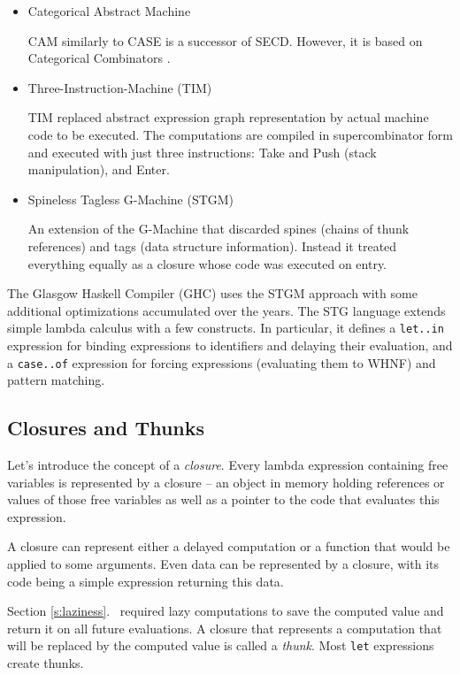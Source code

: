 \documentclass[en]{pracamgr}
\newcommand{\myref}[1]{\ref{#1}.~\textit{\nameref{#1}}}
\begin{document}
\begin{itemize}
    \item Categorical Abstract Machine \cite{CAM0,CAM}
    
        CAM similarly to CASE is a successor of SECD.
        However, it is based on Categorical Combinators
        \cite{categorical_combinators}.

    \item Three-Instruction-Machine (TIM) \cite{TIM}
    
        TIM replaced abstract expression graph representation
        by actual machine code to be executed.
        The computations are compiled in supercombinator form
        and executed with just three instructions: Take and Push
        (stack manipulation), and Enter.

    \item Spineless Tagless G-Machine (STGM) \cite{STGM}
    
        An extension of the G-Machine that discarded spines
        (chains of thunk references) and tags (data structure information).
        Instead it treated everything equally as a closure
        whose code was executed on entry.

\end{itemize}

The Glasgow Haskell Compiler (GHC) uses the STGM approach with some additional
optimizations accumulated over the years.
The STG language extends simple lambda calculus with a few
constructs. In particular, it defines a \texttt{let..in} expression
for binding expressions to identifiers and delaying their evaluation,
and a \texttt{case..of} expression for forcing expressions (evaluating them to WHNF) and pattern matching.

\subsection{Closures and Thunks}\label{s:closures}

Let's introduce the concept of a \textit{closure}.
Every lambda expression containing free variables is represented by a closure --
an object in memory holding references or values of those free variables
as well as a pointer to the code that evaluates this expression.

A closure can represent either a delayed computation or
a function that would be applied to some arguments.
Even data can be represented by a closure, with its code
being a simple expression returning this data.

Section \myref{s:laziness} required lazy computations to
save the computed value and return it on all future
evaluations. A closure that represents a computation that will
be replaced by the computed value is called a \textit{thunk}.
Most \texttt{let} expressions create thunks.
\end{document}
